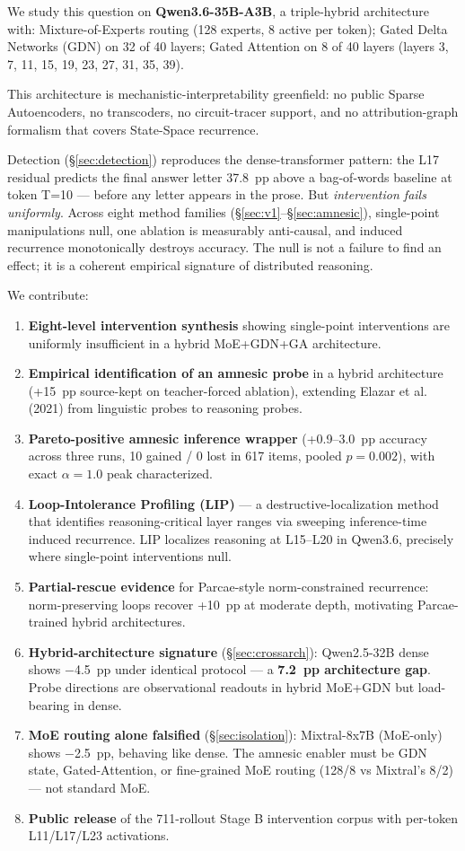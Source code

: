 \documentclass[11pt]{article}
\begin{document}
We study this question on \textbf{Qwen3.6-35B-A3B}, a triple-hybrid architecture with: Mixture-of-Experts routing (128 experts, 8 active per token); Gated Delta Networks (GDN) on 32 of 40 layers; Gated Attention on 8 of 40 layers (layers 3, 7, 11, 15, 19, 23, 27, 31, 35, 39).

This architecture is mechanistic-interpretability greenfield: no public Sparse Autoencoders, no transcoders, no circuit-tracer support, and no attribution-graph formalism that covers State-Space recurrence.

Detection (\S\ref{sec:detection}) reproduces the dense-transformer pattern: the L17 residual predicts the final answer letter 37.8~pp above a bag-of-words baseline at token T=10 --- before any letter appears in the prose. But \emph{intervention fails uniformly}. Across eight method families (\S\ref{sec:v1}--\S\ref{sec:amnesic}), single-point manipulations null, one ablation is measurably anti-causal, and induced recurrence monotonically destroys accuracy. The null is not a failure to find an effect; it is a coherent empirical signature of distributed reasoning.

We contribute:
\begin{enumerate}[leftmargin=*, topsep=0pt]
  \item \textbf{Eight-level intervention synthesis} showing single-point interventions are uniformly insufficient in a hybrid MoE+GDN+GA architecture.
  \item \textbf{Empirical identification of an amnesic probe} in a hybrid architecture (+15~pp source-kept on teacher-forced ablation), extending Elazar et al. (2021) from linguistic probes to reasoning probes.
  \item \textbf{Pareto-positive amnesic inference wrapper} (+0.9--3.0~pp accuracy across three runs, 10 gained / 0 lost in 617 items, pooled $p=0.002$), with exact $\alpha=1.0$ peak characterized.
  \item \textbf{Loop-Intolerance Profiling (LIP)} --- a destructive-localization method that identifies reasoning-critical layer ranges via sweeping inference-time induced recurrence. LIP localizes reasoning at L15--L20 in Qwen3.6, precisely where single-point interventions null.
  \item \textbf{Partial-rescue evidence} for Parcae-style norm-constrained recurrence: norm-preserving loops recover +10~pp at moderate depth, motivating Parcae-trained hybrid architectures.
  \item \textbf{Hybrid-architecture signature} (\S\ref{sec:crossarch}): Qwen2.5-32B dense shows $-$4.5~pp under identical protocol --- a \textbf{7.2~pp architecture gap}. Probe directions are observational readouts in hybrid MoE+GDN but load-bearing in dense.
  \item \textbf{MoE routing alone falsified} (\S\ref{sec:isolation}): Mixtral-8x7B (MoE-only) shows $-$2.5~pp, behaving like dense. The amnesic enabler must be GDN state, Gated-Attention, or fine-grained MoE routing (128/8 vs Mixtral's 8/2) --- not standard MoE.
  \item \textbf{Public release} of the 711-rollout Stage B intervention corpus with per-token L11/L17/L23 activations.
\end{enumerate}
\end{document}
